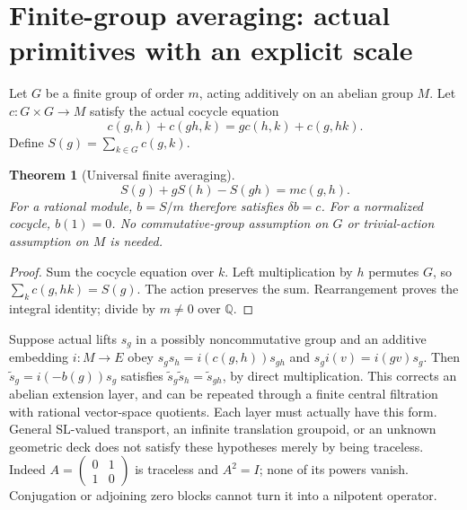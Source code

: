 \documentclass[11pt]{article}
\newtheorem{theorem}{Theorem}
\newcommand{\Q}{\mathbb Q}\newcommand{\Z}{\mathbb Z}
\begin{document}
\section{Finite-group averaging: actual primitives with an explicit scale}
Let $G$ be a finite group of order $m$, acting additively on an abelian
group $M$. Let $c:G\times G\to M$ satisfy the actual cocycle equation
\[
 c(g,h)+c(gh,k)=g c(h,k)+c(g,hk).
\]
Define $S(g)=\sum_{k\in G}c(g,k)$.
\begin{theorem}[Universal finite averaging]
\[
 S(g)+gS(h)-S(gh)=m c(g,h).
\]
For a rational module, $b=S/m$ therefore satisfies $\delta b=c$.
For a normalized cocycle, $b(1)=0$. No commutative-group assumption on $G$
or trivial-action assumption on $M$ is needed.
\end{theorem}
\begin{proof}
Sum the cocycle equation over $k$. Left multiplication by $h$ permutes $G$,
so $\sum_k c(g,hk)=S(g)$. The action preserves the sum. Rearrangement proves
the integral identity; divide by $m\ne0$ over $\Q$.
\end{proof}
Suppose actual lifts $s_g$ in a possibly noncommutative group and an additive
embedding $i:M\to E$ obey
$s_gs_h=i(c(g,h))s_{gh}$ and
$s_g i(v)=i(gv)s_g$. Then $\widetilde s_g=i(-b(g))s_g$ satisfies
$\widetilde s_g\widetilde s_h=\widetilde s_{gh}$, by direct multiplication.
This corrects an abelian extension layer, and can be repeated through
a finite central filtration with rational vector-space quotients. Each
layer must actually have this form. General $\mathrm{SL}$-valued transport,
an infinite translation groupoid, or an unknown geometric deck does not
satisfy these hypotheses merely by being traceless.
Indeed $A=\left(\begin{smallmatrix}0&1\\1&0\end{smallmatrix}\right)$ is
traceless and $A^2=I$; none of its powers vanish. Conjugation or adjoining
zero blocks cannot turn it into a nilpotent operator.
\end{document}
